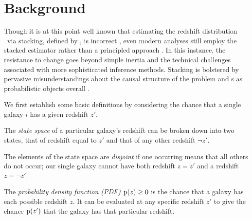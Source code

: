 \section{Background}

Though it is at this point well known that estimating the redshift distribution \Nz\ via stacking, defined by , is incorrect \citep{leistedt_hierarchical_2016, malz_chippr_nodate}, even modern analyses still employ the stacked estimator rather than a principled approach \citep{sheldon_photometric_2012, hoyle_dark_2017}.
In this instance, the resistance to change goes beyond simple inertia and the technical challenges associated with more sophisticated inference methods.
Stacking is bolstered by pervasive misunderstandings about the causal structure of the problem and \pzpdf s as probabilistic objects overall \citep{jarvis_rmjarvis_nodate, malz_aimalz_nodate}.


We first establish some basic definitions by considering the chance that a single galaxy $i$ has a given redshift $z'$.

\begin{definition}\label{def:binarystatespace}
	The \textit{state space} of a particular galaxy's redshift can be broken down into two states, that of redshift equal to $z'$ and that of any other redshift $\lnot z'$.
\end{definition}

\begin{definition}\label{def:disjoint}
	The elements of the state space are \textit{disjoint} if one occurring means that all others do not occur; our single galaxy cannot have both redshift $z = z'$ and a redshift $z = \lnot z'$.
\end{definition}

\begin{definition}\label{def:pdens}
	The \textit{probability density function (PDF)} $\mathrm{p}(z) \geq 0$ is the chance that a galaxy has each possible redshift $z$.
	It can be evaluated at any specific redshift $z'$ to give the chance $\mathrm{p}(z')$ that the galaxy has that particular redshift.
\end{definition}

